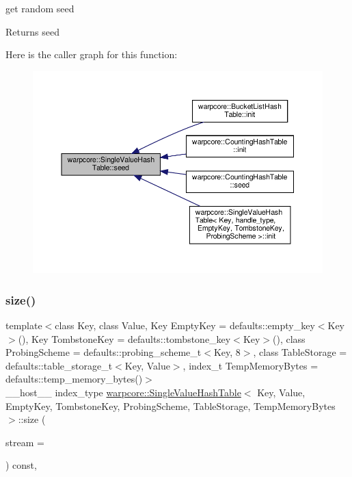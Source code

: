 get random seed 

\begin{DoxyReturn}{Returns}
seed 
\end{DoxyReturn}
Here is the caller graph for this function\+:
\nopagebreak
\begin{figure}[H]
\begin{center}
\leavevmode
\includegraphics[width=350pt]{classwarpcore_1_1SingleValueHashTable_a28ba5f6952bad405f7d005cd5867e973_icgraph}
\end{center}
\end{figure}
\mbox{\label{classwarpcore_1_1SingleValueHashTable_a6c0e8d90665fe1eb9accf10256b57f28}} 
\subsubsection{\texorpdfstring{size()}{size()}}
{\footnotesize\ttfamily template$<$class Key, class Value, Key Empty\+Key = defaults\+::empty\+\_\+key$<$\+Key$>$(), Key Tombstone\+Key = defaults\+::tombstone\+\_\+key$<$\+Key$>$(), class Probing\+Scheme = defaults\+::probing\+\_\+scheme\+\_\+t$<$\+Key, 8$>$, class Table\+Storage = defaults\+::table\+\_\+storage\+\_\+t$<$\+Key, Value$>$, index\+\_\+t Temp\+Memory\+Bytes = defaults\+::temp\+\_\+memory\+\_\+bytes()$>$ \\
\+\_\+\+\_\+host\+\_\+\+\_\+ index\+\_\+type \hyperlink{classwarpcore_1_1SingleValueHashTable}{warpcore\+::\+Single\+Value\+Hash\+Table}$<$ Key, Value, Empty\+Key, Tombstone\+Key, Probing\+Scheme, Table\+Storage, Temp\+Memory\+Bytes $>$\+::size (\begin{DoxyParamCaption}\item[{const cuda\+Stream\+\_\+t}]{stream = {} }\end{DoxyParamCaption}) const\hspace{0.3cm}{\ttfamily [inline]}, {\ttfamily [noexcept]}}



